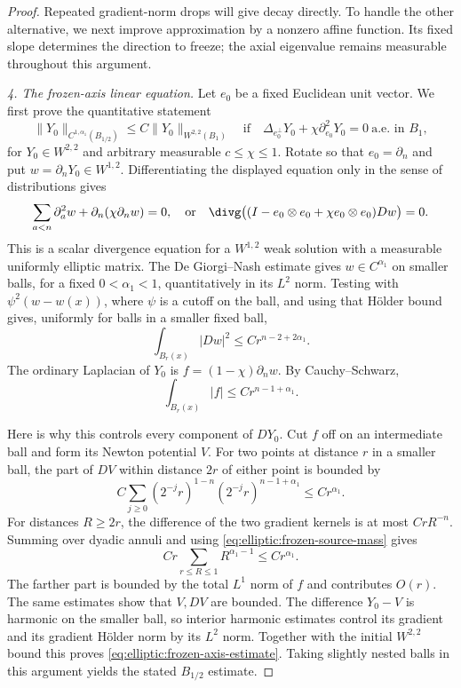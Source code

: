 \begin{proof}
Repeated gradient-norm drops will give decay directly.  To handle the
other alternative, we next improve approximation by a nonzero affine
function.  Its fixed slope determines the direction to freeze; the
axial eigenvalue remains measurable throughout this argument.

\medskip\noindent
\emph{4. The frozen-axis linear equation.}
Let $e_0$ be a fixed Euclidean unit vector.  We first prove the quantitative
statement
\begin{equation}
 \|Y_0\|_{C^{1,\alpha_1}(B_{1/2})}
      \leq C\|Y_0\|_{W^{2,2}(B_1)}
 \quad\text{if}\quad
 \Delta_{e_0^\perp}Y_0+\chi\partial_{e_0}^2Y_0=0
 \ \text{a.e. in }B_1,
 \label{eq:elliptic:frozen-axis-estimate}
\end{equation}
for $Y_0\in W^{2,2}$ and arbitrary measurable $c\leq\chi\leq1$.
Rotate so that $e_0=\partial_n$ and put $w=\partial_nY_0\in W^{1,2}$.
Differentiating the displayed equation only in the sense of distributions
gives
\begin{equation}
 \sum_{a<n}\partial_a^2w+\partial_n(\chi\partial_nw)=0,
 \quad\text{or}\quad
 \divg\bigl((I-e_0\otimes e_0+\chi e_0\otimes e_0)Dw\bigr)=0.
 \label{eq:elliptic:frozen-derivative-divergence}
\end{equation}
This is a scalar divergence equation for a $W^{1,2}$ weak solution with
a measurable uniformly elliptic matrix.  The De Giorgi--Nash estimate
gives $w\in C^{\alpha_1}$ on smaller balls, for a fixed
$0<\alpha_1<1$, quantitatively in its $L^2$ norm.  Testing with
$\psi^2(w-w(x))$, where $\psi$ is a cutoff on the ball, and using that
H\"older bound gives, uniformly for balls in a smaller fixed ball,
\begin{equation}
 \int_{B_r(x)}|Dw|^2\leq C r^{n-2+2\alpha_1}.
 \label{eq:elliptic:frozen-derivative-morrey}
\end{equation}
The ordinary Laplacian of $Y_0$ is
$f=(1-\chi)\partial_nw$.  By Cauchy--Schwarz,
\begin{equation}
 \int_{B_r(x)}|f|\leq C r^{n-1+\alpha_1}.
 \label{eq:elliptic:frozen-source-mass}
\end{equation}

Here is why this controls every component of $DY_0$.  Cut $f$ off on
an intermediate ball and form its Newton potential $V$.  For two points
at distance $r$ in a smaller ball, the part of $DV$ within distance
$2r$ of either point is bounded by
\[
 C\sum_{j\geq0}(2^{-j}r)^{1-n}(2^{-j}r)^{n-1+\alpha_1}
       \leq Cr^{\alpha_1}.
\]
For distances $R\geq2r$, the difference of the two gradient kernels is
at most $CrR^{-n}$.  Summing over dyadic annuli and using
\eqref{eq:elliptic:frozen-source-mass} gives
\[
 Cr\sum_{r\leq R\leq1}R^{\alpha_1-1}
       \leq Cr^{\alpha_1}.
\]
The farther part is bounded by the total $L^1$ norm of $f$ and contributes
$O(r)$.  The same estimates show that $V,DV$ are bounded.  The difference
$Y_0-V$ is harmonic on the smaller ball, so interior harmonic estimates
control its gradient and its gradient H\"older norm by its $L^2$ norm.
Together with the initial $W^{2,2}$ bound this proves
\eqref{eq:elliptic:frozen-axis-estimate}.  Taking slightly nested
balls in this argument yields the stated $B_{1/2}$ estimate.


\end{proof}

